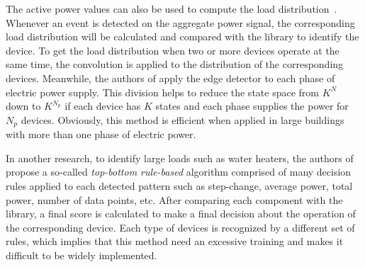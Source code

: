 The active power values can also be used to compute the load distribution~\cite{Chuang11}. Whenever an event is detected on the aggregate power signal, the corresponding load distribution will be calculated and compared with the library to identify the device. To get the load distribution when two or more devices operate at the same time, the convolution is applied to the distribution of the corresponding devices.
Meanwhile, the authors of \cite{Batra2013} apply the edge detector to each phase of electric power supply. This division helps to reduce the state space from $K^N$ down to $K^{N_p}$ if each device has $K$ states and each phase supplies the power for $N_p$ devices. Obviously, this method is efficient when applied in large buildings with more than one phase of electric power.

In another research, to identify large loads such as water heaters, the authors of~\cite{Farinaccio99EB} propose a so-called \textit{top-bottom rule-based} algorithm comprised of many decision rules applied to each detected pattern such as step-change, average power, total power, number of data points, etc. After comparing each component with the library, a final score is calculated to make a final decision about the operation of the corresponding device. Each type of devices is recognized by a different set of rules, which implies that this method need an excessive training and makes it difficult to be widely implemented.

